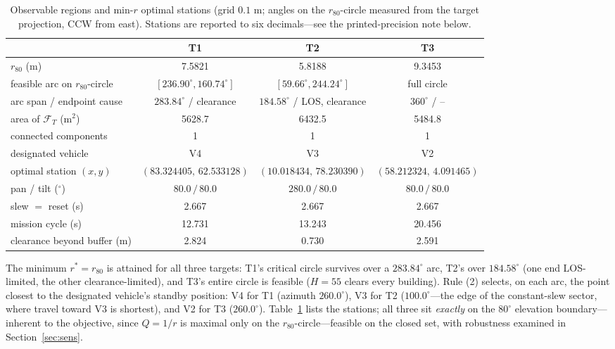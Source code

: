 \begin{table}[!htb]\centering\footnotesize\setlength{\tabcolsep}{4pt}
\caption{Observable regions and min-$r$ optimal stations (grid $0.1$ m; angles on the
$r_{80}$-circle measured from the target projection, CCW from east). Stations are
reported to six decimals---see the printed-precision note below.}
\label{tab:q1opt}
\begin{tabular}{lccc}
\toprule
 & T1 & T2 & T3 \\
\midrule
$r_{80}$ (m) & 7.5821 & 5.8188 & 9.3453 \\
feasible arc on $r_{80}$-circle & $[236.90^\circ,160.74^\circ]$ & $[59.66^\circ,244.24^\circ]$ & full circle \\
arc span / endpoint cause & $283.84^\circ$ / clearance & $184.58^\circ$ / LOS, clearance & $360^\circ$ / -- \\
area of $\mathcal{F}_T$ (m$^2$) & 5628.7 & 6432.5 & 5484.8 \\
connected components & 1 & 1 & 1 \\
designated vehicle & V4 & V3 & V2 \\
optimal station $(x,y)$ & $(83.324405,\,62.533128)$ & $(10.018434,\,78.230390)$ & $(58.212324,\,4.091465)$ \\
pan / tilt ($^\circ$) & $80.0\,/\,80.0$ & $280.0\,/\,80.0$ & $80.0\,/\,80.0$ \\
slew $=$ reset (s) & 2.667 & 2.667 & 2.667 \\
mission cycle (s) & 12.731 & 13.243 & 20.456 \\
clearance beyond buffer (m) & 2.824 & 0.730 & 2.591 \\
\bottomrule
\end{tabular}
\end{table}

The minimum $r^{*}=r_{80}$ is attained for all three targets: T1's critical circle
survives over a $283.84^\circ$ arc, T2's over $184.58^\circ$ (one end LOS-limited, the
other clearance-limited), and T3's entire circle is feasible ($H=55$ clears every
building). Rule (2) selects, on each arc, the point closest to the designated
vehicle's standby position: V4 for T1 (azimuth $260.0^\circ$), V3 for T2
($100.0^\circ$---the edge of the constant-slew sector, where travel toward V3 is
shortest), and V2 for T3 ($260.0^\circ$). Table~\ref{tab:q1opt} lists the stations;
all three sit \emph{exactly} on the $80^\circ$ elevation boundary---inherent to the
objective, since $Q=1/r$ is maximal only on the $r_{80}$-circle---feasible on the
closed set, with robustness examined in Section~\ref{sec:sens}.

